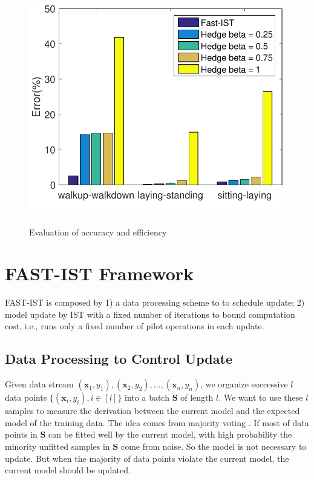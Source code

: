 \documentclass[letterpaper]{article}
\begin{document}
\begin{figure}[t]
{\includegraphics[scale=0.4]{figures/actualexp.pdf}
\label{fig:aaccuracy}}
\caption{Evaluation of accuracy and efficiency}
\end{figure}


\section{FAST-IST Framework}
FAST-IST is composed by 1) a data processing scheme to to schedule update; 2) model update by IST with a fixed number of iterations to bound computation cost, i.e., runs only a fixed number of pilot operations in each update.

\subsection{Data Processing to Control Update}
Given data stream $(\mathbf{x}_1, y_1), (\mathbf{x}_2, y_2), \ldots, (\mathbf{x}_n, y_n)$, we organize successive $l$ data points $\{(\mathbf{x}_i, y_i), i \in [l]\}$ into a batch $\mathbf{S}$  of length $l$.
We want to use these $l$ samples to measure the derivation between the current model and the expected model of the training data.
The idea comes from majority voting\cite{Ao:2016} \cite{penrose1946elementary}\cite{lam1997application}.
If most of data points in $\mathbf{S}$ can be fitted well by the current model, with high probability the minority unfitted samples in $\mathbf{S}$ come from noise. So the model is not necessary to update. But when the majority of data points violate the current model, the current model should be updated.
\end{document}
